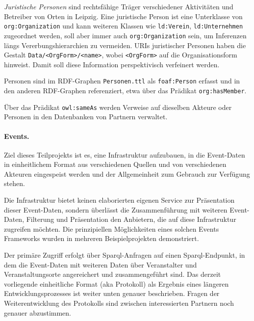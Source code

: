 \documentclass[a4paper,11pt]{article}
\begin{document}
\emph{Juristische Personen} sind rechtsfähige Träger verschiedener Aktivitäten
und Betreiber von Orten in Leipzig. Eine juristische Person ist eine
Unterklasse von \texttt{org:Organization} und kann weiteren Klassen wie
\texttt{ld:Verein}, \texttt{ld:Unternehmen} zugeordnet werden, soll aber immer
auch \texttt{org:Organization} sein, um Inferenzen längs Vererbungshierarchien
zu vermeiden. URIs juristischer Personen haben die Gestalt
\texttt{Data/<OrgForm>/<name>}, wobei \texttt{<OrgForm>} auf die
Organisationsform hinweist. Damit soll diese Information perspektivisch
verfeinert werden.

Personen sind im RDF-Graphen \texttt{Personen.ttl} als \texttt{foaf:Person}
erfasst und in den anderen RDF-Graphen referenziert, etwa über das Prädikat
\texttt{org:hasMember}.

Über das Prädikat \texttt{owl:sameAs} werden Verweise auf dieselben Akteure
oder Personen in den Datenbanken von Partnern verwaltet. 

\paragraph{Events.}
Ziel dieses Teilprojekts ist es, eine Infrastruktur aufzubauen, in die
Event-Daten in einheitlichem Format aus verschiedenen Quellen und von
verschiedenen Akteuren eingespeist werden und der Allgemeinheit zum Gebrauch
zur Verfügung stehen.

Die Infrastruktur bietet keinen elaborierten eigenen Service zur Präsentation
dieser Event-Daten, sondern überlässt die Zusammenführung mit weiteren
Event-Daten, Filterung und Präsentation den Anbietern, die auf diese
Infrastruktur zugreifen möchten. Die prinzipiellen Möglichkeiten eines solchen
Events Frameworks wurden in mehreren Beispielprojekten demonstriert. 

Der primäre Zugriff erfolgt über Sparql-Anfragen auf einen Sparql-Endpunkt, in
dem die Event-Daten mit weiteren Daten über Veranstalter und
Veranstaltungsorte angereichert und zusammengeführt sind.  Das derzeit
vorliegende einheitliche Format (aka Protokoll) als Ergebnis eines längeren
Entwicklungsprozesses ist weiter unten genauer beschrieben. Fragen der
Weiterentwicklung des Protokolls sind zwischen interessierten Partnern noch
genauer abzustimmen.
\end{document}
